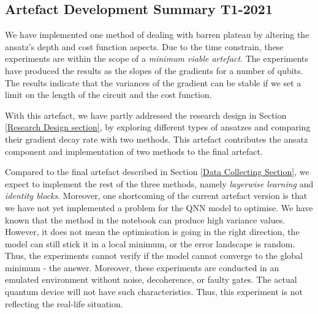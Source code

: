 \subsection{Artefact Development Summary T1-2021}
We have implemented one method of dealing with barren plateau by altering the ansatz's depth and cost function aspects.
Due to the time constrain, these experiments are within the scope of a \textit{minimum viable artefact}.
The experiments have produced the results as the slopes of the gradients for a number of qubits.
The results indicate that the variances of the gradient can be stable if we set a limit on the length of the circuit and the cost function.

With this artefact, we have partly addressed the research design in Section \ref{Research Design section}, by exploring different types of ansatzes and comparing their gradient decay rate with two methods.
This artefact contributes the ansatz component and implementation of two methods to the final artefact.

Compared to the final artefact described in Section \ref{Data Collecting Section}, we expect to implement the rest of the three methods, namely \textit{layerwise learning} and \textit{identity blocks}.
Moreover, one shortcoming of the current artefact version is that we have not yet implemented a problem for the QNN model to optimise.
We have known that the method in the notebook can produce high variance values. 
However, it does not mean the optimisation is going in the right direction, the model can still stick it in a local minimum, or the error landscape is random. 
Thus, the experiments cannot verify if the model cannot converge to the global minimum - the answer.
Moreover, these experiments are conducted in an emulated environment without noise, decoherence, or faulty gates.
The actual quantum device will not have such characteristics.
Thus, this experiment is not reflecting the real-life situation.